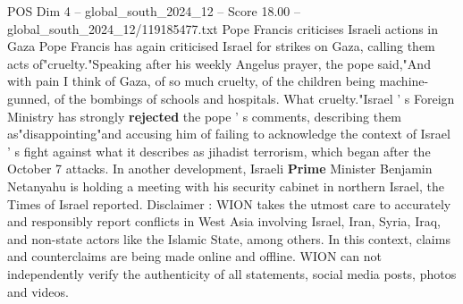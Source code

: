 \begin{textsample}{POS Dim 4 – global\_south\_2024\_12 – Score 18.00 – global\_south\_2024\_12/119185477.txt}
Pope Francis criticises Israeli actions in Gaza Pope Francis has again criticised Israel for strikes on Gaza, calling them acts of"cruelty."Speaking after his weekly Angelus prayer, the pope said,"And with pain I think of Gaza, of so much cruelty, of the children being machine-gunned, of the bombings of schools and hospitals.
What cruelty."Israel ' s Foreign Ministry has strongly \textbf{rejected} the pope ' s comments, describing them as"disappointing"and accusing him of failing to acknowledge the context of Israel ' s fight against what it describes as jihadist terrorism, which began after the October 7 attacks.
In another development, Israeli \textbf{Prime} Minister Benjamin Netanyahu is holding a meeting with his security cabinet in northern Israel, the Times of Israel reported.
Disclaimer : WION takes the utmost care to accurately and responsibly report conflicts in West Asia involving Israel, Iran, Syria, Iraq, and non-state actors like the Islamic State, among others.
In this context, claims and counterclaims are being made online and offline.
WION can not independently verify the authenticity of all statements, social media posts, photos and videos.

\end{textsample}

